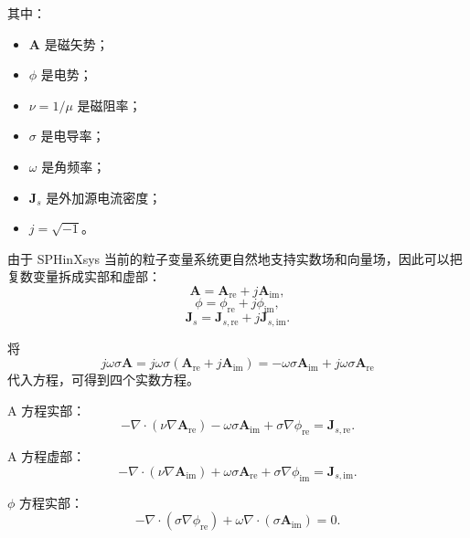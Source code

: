 \documentclass[UTF8,11pt]{ctexart}
\begin{document}
其中：
\begin{itemize}
    \item $\bm A$ 是磁矢势；
    \item $\phi$ 是电势；
    \item $\nu = 1/\mu$ 是磁阻率；
    \item $\sigma$ 是电导率；
    \item $\omega$ 是角频率；
    \item $\bm J_s$ 是外加源电流密度；
    \item $j=\sqrt{-1}$。
\end{itemize}

由于 SPHinXsys 当前的粒子变量系统更自然地支持实数场和向量场，因此可以把复数变量拆成实部和虚部：
\begin{equation}
    \bm A = \bm A_{\mathrm{re}} + j\bm A_{\mathrm{im}},
\end{equation}
\begin{equation}
    \phi = \phi_{\mathrm{re}} + j\phi_{\mathrm{im}},
\end{equation}
\begin{equation}
    \bm J_s = \bm J_{s,\mathrm{re}} + j\bm J_{s,\mathrm{im}}.
\end{equation}

将
\begin{equation}
    j\omega\sigma\bm A
    =
    j\omega\sigma
    \left(
        \bm A_{\mathrm{re}} + j\bm A_{\mathrm{im}}
    \right)
    =
    -\omega\sigma\bm A_{\mathrm{im}}
    +
    j\omega\sigma\bm A_{\mathrm{re}}
\end{equation}
代入方程，可得到四个实数方程。

A 方程实部：
\begin{equation}
    -\nabla\cdot(\nu\nabla \bm A_{\mathrm{re}})
    - \omega\sigma\bm A_{\mathrm{im}}
    + \sigma\nabla\phi_{\mathrm{re}}
    =
    \bm J_{s,\mathrm{re}} .
    \label{eq:a-real}
\end{equation}

A 方程虚部：
\begin{equation}
    -\nabla\cdot(\nu\nabla \bm A_{\mathrm{im}})
    + \omega\sigma\bm A_{\mathrm{re}}
    + \sigma\nabla\phi_{\mathrm{im}}
    =
    \bm J_{s,\mathrm{im}} .
    \label{eq:a-imag}
\end{equation}

$\phi$ 方程实部：
\begin{equation}
    -\nabla\cdot(\sigma\nabla \phi_{\mathrm{re}})
    + \omega\nabla\cdot(\sigma\bm A_{\mathrm{im}})
    =
    0 .
    \label{eq:phi-real}
\end{equation}
\end{document}
